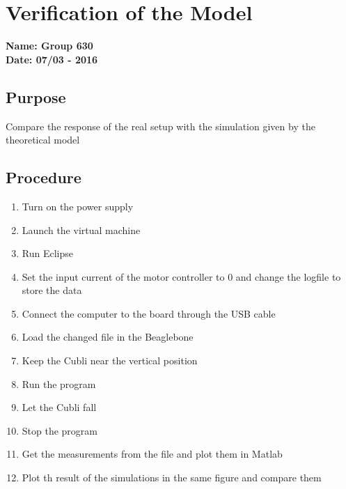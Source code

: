 \chapter{Verification of the Model}

\textbf{Name: Group 630}\\
\textbf{Date: 07/03 - 2016}

\section*{Purpose}
Compare the response of the real setup with the simulation given by the theoretical model

\section*{Procedure}
\begin{enumerate}
	\item{Turn on the power supply}
	\item{Launch the virtual machine}
	\item{Run Eclipse}
	\item{Set the input current of the motor controller to 0 and change the logfile to store the data}
	\item{Connect the computer to the board through the USB cable}
	\item{Load the changed file in the Beaglebone}
	\item{Keep the Cubli near the vertical position}
	\item{Run the program}
	\item{Let the Cubli fall}
	\item{Stop the program}
	\item{Get the measurements from the file and plot them in Matlab}
	\item{Plot th result of the simulations in the same figure and compare them}
\end{enumerate}

